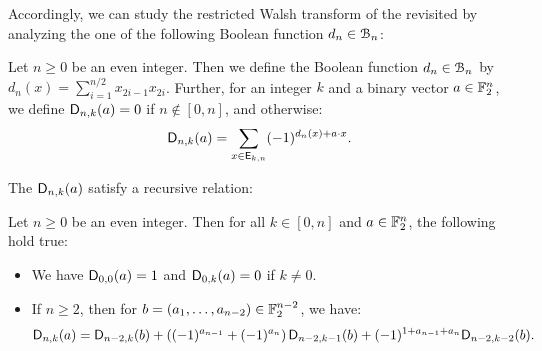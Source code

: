 \documentclass[11pt]{llncs}
\begin{document}

Accordingly, we can study the restricted Walsh transform of the revisited \hwbf{} by analyzing the one of the following Boolean function $d_n\in\mathcal{B}_n$:

\begin{definition}
Let $n\geq 0$ be an even integer. Then we define the Boolean function $d_n\in\mathcal{B}_n$ by $d_n(x)=\sum_{i=1}^{n/2}x_{2i-1}x_{2i}$. Further, for an integer $k$ and a binary vector $a\in\mathbb{F}_2^n$, we define $\mathsf{D}_{n,k}(a)=0$ if $n\not\in[0,n]$, and otherwise:
\[
    \mathsf{D}_{n,k}(a)=\sum_{x\in \mathsf{E}_{k,n}} (-1)^{d_n(x) +a\cdot x}.
\]
\end{definition}

The $\mathsf{D}_{n,k}(a)$ satisfy a recursive relation:

\begin{proposition}\label{prop:recursiveDnka}
Let $n\geq 0$ be an even integer. Then for all $k\in[0,n]$ and $a\in\mathbb{F}_2^n$, the following hold true:
\begin{itemize}
    \item We have $\mathsf{D}_{0,0}(a)=1$ and $\mathsf{D}_{0,k}(a)=0$ if $k\neq 0$.
    \item If $n\geq 2$, then for $b=(a_1,\dots,a_{n-2})\in\mathbb{F}_2^{n-2}$, we have:
    \[\mathsf{D}_{n,k}(a)=\mathsf{D}_{n-2,k}(b)+\left((-1)^{a_{n-1}} + (-1)^{a_{n}}\right)\mathsf{D}_{n-2,k-1}(b) + (-1)^{1+a_{n-1}+a_n} \mathsf{D}_{n-2,k-2}(b).\]
\end{itemize}
\end{proposition}
\end{document}
